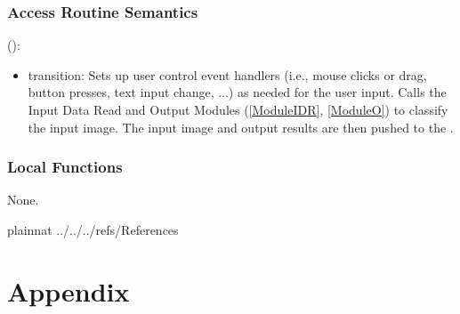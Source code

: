 \documentclass[12pt, titlepage]{article}
\begin{document}
\subsubsection{Access Routine Semantics}

\noindent {}():
\begin{itemize}
\item transition: Sets up user control event handlers (i.e., mouse clicks or drag, button presses, text input change, ...) 
as needed for the user input. Calls the Input Data Read and Output Modules (\ref{ModuleIDR}, \ref{ModuleO}) to classify the input
image. The input image and output results are then pushed to the .
\end{itemize}

\subsubsection{Local Functions}

None.
  
\newpage

 {plainnat}
 {../../../refs/References}

\newpage

\section{Appendix} \label{Appendix}

\end{document}
